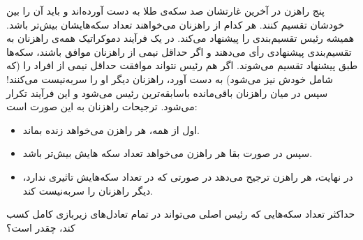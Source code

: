 پنج راهزن در آخرین غارتشان صد سکه‌ی طلا به دست آورده‌اند و باید آن را بین خودشان تقسیم کنند. هر کدام از راهزنان می‌خواهند تعداد سکه‌هایشان بیش‌تر باشد.
همیشه رئیس تقسیم‌بندی را پیشنهاد می‌کند. در یک فرآیند دموکراتیک همه‌ی راهزنان به تقسیم‌بندی پیشنهادی رأی می‌دهند و اگر حداقل نیمی از راهزنان موافق باشند، سکه‌ها طبق پیشنهاد تقسیم می‌شوند. اگر هم رئیس نتواند موافقت حداقل نیمی از افراد را (که شامل خودش نیز می‌شود) به دست آورد، راهزنان دیگر او را سربه‌نیست می‌کنند! سپس در میان راهزنان باقی‌مانده باسابقه‌ترین رئیس می‌شود و این فرآیند تکرار می‌شود.
ترجیحات راهزنان به این صورت است:
\begin{itemize}
    \item اول از همه، هر راهزن می‌خواهد زنده بماند.
    \item سپس در صورت بقا هر راهزن می‌خواهد تعداد سکه هایش بیش‌تر باشد.
    \item در نهایت، هر راهزن ترجیح می‌دهد در صورتی که در تعداد سکه‌هایش تاثیری ندارد، دیگر راهزنان را سربه‌نیست کند.
\end{itemize}
حداکثر تعداد سکه‌هایی که رئیس اصلی می‌تواند در تمام تعادل‌های زیربازی کامل کسب کند، چقدر است؟
